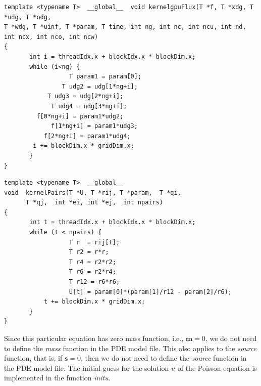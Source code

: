 \documentclass[11pt]{article}
\begin{document}
%
%
\begin{verbatim}
template <typename T>  __global__  void kernelgpuFlux(T *f, T *xdg, T *udg, T *odg, 
T *wdg, T *uinf, T *param, T time, int ng, int nc, int ncu, int nd, int ncx, int nco, int ncw)
{
	   int i = threadIdx.x + blockIdx.x * blockDim.x;
	   while (i<ng) {
		 	      T param1 = param[0];
		   	    T udg2 = udg[1*ng+i];
	   	    T udg3 = udg[2*ng+i];
	  	     T udg4 = udg[3*ng+i];
   	  	 f[0*ng+i] = param1*udg2;
	  	     f[1*ng+i] = param1*udg3;
	  	   f[2*ng+i] = param1*udg4;
	  	i += blockDim.x * gridDim.x;
	   }  
}
\end{verbatim}


\begin{verbatim}
template <typename T>  __global__  
void  kernelPairs(T *U, T *rij, T *param,  T *qi, 
      T *qj,  int *ei, int *ej,  int npairs)
{
	   int t = threadIdx.x + blockIdx.x * blockDim.x;
	   while (t < npairs) {
			      T r  = rij[t];
			      T r2 = r*r;
			      T r4 = r2*r2;
			      T r6 = r2*r4;
			      T r12 = r6*r6;
			      U[t] = param[0]*(param[1]/r12 - param[2]/r6);			      
	  	   t += blockDim.x * gridDim.x;
	   }  
}
\end{verbatim}


Since this particular equation has zero mass function, i.e., $\bm m = 0$, we do not need to define the {\em mass} function in the PDE model file. This also applies to the {\em source} function, that is, if $\bm s = 0$, then we do not need to define the {\em source} function in the PDE model file. The initial guess for the solution $u$ of the Poisson equation is implemented in the function {\em initu}.
\end{document}
